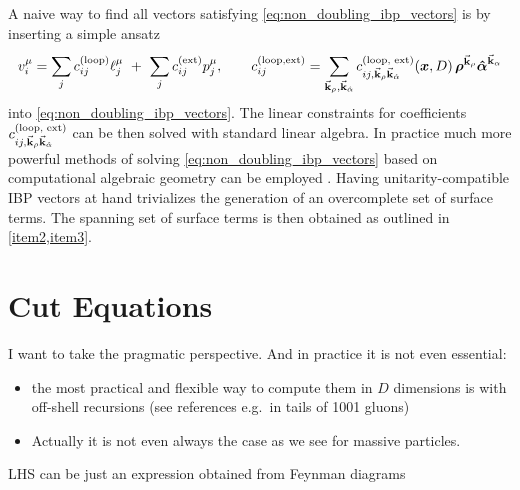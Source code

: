 {
  \def\coeff{c^{(\text{loop, ext})}_{ij,\va{k}_\rho \va{k}_{\hat{\alpha}}}}
  A naive way to find all vectors satisfying \cref{eq:non_doubling_ibp_vectors}
  is by inserting a simple ansatz
  \begin{equation}
    v_i^\mu = \sum_{j}^{}c^{(\text{loop})}_{ij}\ell^\mu_j ~+~  \sum_{j}^{}c^{(\text{ext})}_{ij} p^\mu_j, \qquad
    c_{ij}^{(\text{loop,ext})} = \sum_{\va{k}_\rho, \va{k}_{\hat{\alpha}}} \coeff (\vb*{x},D)\, \vb*{\rho}^{\va{k}_\rho}\vb*{\hat{\alpha}}^{\va{k}_\alpha}
  \end{equation}
  into \cref{eq:non_doubling_ibp_vectors}.
  The linear constraints for coefficients $\coeff$ can be then solved with standard linear algebra.
}%
In practice much more powerful methods of solving \cref{eq:non_doubling_ibp_vectors}  based on computational
algebraic geometry can be employed \cite{Larsen:2015ped,Boehm:2018fpv,Zhang:2016kfo,Abreu:2017xsl,Bendle2019}.
Having unitarity-compatible IBP vectors at hand trivializes the generation of an overcomplete set of surface terms.
The spanning set of surface terms is then obtained as outlined in \cref{item2,item3}.






\section{Cut Equations}
\label{sec:cut_equations}

I want to take the pragmatic perspective. And in practice it is not even essential:
\begin{itemize}
    \item       the most practical and flexible way to compute them in $D$ dimensions is with off-shell recursions (see references e.g.\ in tails of 1001 gluons)
    \item Actually it is not even always the case as we see for massive particles.
\end{itemize}

LHS can be just an expression obtained from Feynman diagrams


